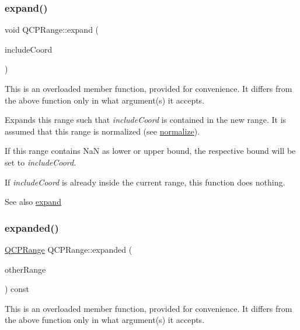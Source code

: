 \subsubsection{\texorpdfstring{expand()}{expand()}\hspace{0.1cm}{\footnotesize\ttfamily [2/2]}}
{\footnotesize\ttfamily void Q\+C\+P\+Range\+::expand (\begin{DoxyParamCaption}\item[{double}]{include\+Coord }\end{DoxyParamCaption})}

This is an overloaded member function, provided for convenience. It differs from the above function only in what argument(s) it accepts.

Expands this range such that {\itshape include\+Coord} is contained in the new range. It is assumed that this range is normalized (see \hyperlink{class_q_c_p_range_af914a7740269b0604d0827c634a878a9}{normalize}).

If this range contains NaN as lower or upper bound, the respective bound will be set to {\itshape include\+Coord}.

If {\itshape include\+Coord} is already inside the current range, this function does nothing.

\begin{DoxySeeAlso}{See also}
\hyperlink{class_q_c_p_range_a0fa1bc8048be50d52bea93a8caf08305}{expand} 
\end{DoxySeeAlso}
\mbox{\label{class_q_c_p_range_a9cbfb7cd06eac1839cae981e05c19633}} 
\subsubsection{\texorpdfstring{expanded()}{expanded()}\hspace{0.1cm}{\footnotesize\ttfamily [1/2]}}
{\footnotesize\ttfamily \hyperlink{class_q_c_p_range}{Q\+C\+P\+Range} Q\+C\+P\+Range\+::expanded (\begin{DoxyParamCaption}\item[{const \hyperlink{class_q_c_p_range}{Q\+C\+P\+Range} \&}]{other\+Range }\end{DoxyParamCaption}) const}

This is an overloaded member function, provided for convenience. It differs from the above function only in what argument(s) it accepts.


